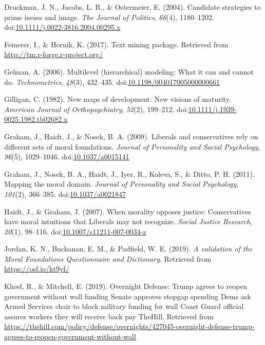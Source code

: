 \documentclass[english,,man]{apa6}
\begin{document}
\hypertarget{ref-Druckman2004}{}
Druckman, J. N., Jacobs, L. R., \& Ostermeier, E. (2004). Candidate
strategies to prime issues and image. \emph{The Journal of Politics},
\emph{66}(4), 1180--1202.
doi:\href{https://doi.org/10.1111/j.0022-3816.2004.00295.x}{10.1111/j.0022-3816.2004.00295.x}

\hypertarget{ref-Feinerer2017}{}
Feinerer, I., \& Hornik, K. (2017). Text mining package. Retrieved from
\url{http://tm.r-forge.r-project.org/}

\hypertarget{ref-Gelman2006}{}
Gelman, A. (2006). Multilevel (hierarchical) modeling: What it can and
cannot do. \emph{Technometrics}, \emph{48}(3), 432--435.
doi:\href{https://doi.org/10.1198/004017005000000661}{10.1198/004017005000000661}

\hypertarget{ref-Gilligan1982}{}
Gilligan, C. (1982). New maps of development: New visions of maturity.
\emph{American Journal of Orthopsychiatry}, \emph{52}(2), 199--212.
doi:\href{https://doi.org/10.1111/j.1939-0025.1982.tb02682.x}{10.1111/j.1939-0025.1982.tb02682.x}

\hypertarget{ref-Graham2009}{}
Graham, J., Haidt, J., \& Nosek, B. A. (2009). Liberals and
conservatives rely on different sets of moral foundations. \emph{Journal
of Personality and Social Psychology}, \emph{96}(5), 1029--1046.
doi:\href{https://doi.org/10.1037/a0015141}{10.1037/a0015141}

\hypertarget{ref-Graham2011}{}
Graham, J., Nosek, B. A., Haidt, J., Iyer, R., Koleva, S., \& Ditto, P.
H. (2011). Mapping the moral domain. \emph{Journal of Personality and
Social Psychology}, \emph{101}(2), 366--385.
doi:\href{https://doi.org/10.1037/a0021847}{10.1037/a0021847}

\hypertarget{ref-Haidt2007}{}
Haidt, J., \& Graham, J. (2007). When morality opposes justice:
Conservatives have moral intuitions that Liberals may not recognize.
\emph{Social Justice Research}, \emph{20}(1), 98--116.
doi:\href{https://doi.org/10.1007/s11211-007-0034-z}{10.1007/s11211-007-0034-z}

\hypertarget{ref-Jordan2019}{}
Jordan, K. N., Buchanan, E. M., \& Padfield, W. E. (2019). \emph{A
validation of the Moral Foundations Questionnaire and Dictionary}.
Retrieved from \url{https://osf.io/kt9yf/}

\hypertarget{ref-Kheel2019}{}
Kheel, R., \& Mitchell, E. (2019). Overnight Defense: Trump agrees to
reopen government without wall funding \textbar{} Senate approves
stopgap spending \textbar{} Dems ask Armed Services chair to block
military funding for wall \textbar{} Coast Guard official assures
workers they will receive back pay \textbar{} TheHill. Retrieved from
\url{https://thehill.com/policy/defense/overnights/427045-overnight-defense-trump-agrees-to-reopen-government-without-wall}
\end{document}
